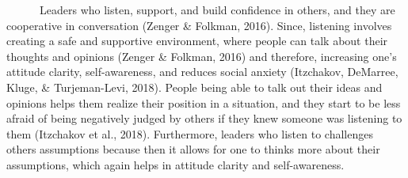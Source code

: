 \documentclass[
  12pt,
]{article}
\begin{document}
~~~~~~Leaders who listen, support, and build confidence in others, and they are cooperative in conversation (Zenger \& Folkman, 2016). Since, listening involves creating a safe and supportive environment, where people can talk about their thoughts and opinions (Zenger \& Folkman, 2016) and therefore, increasing one's attitude clarity, self-awareness, and reduces social anxiety (Itzchakov, DeMarree, Kluge, \& Turjeman-Levi, 2018). People being able to talk out their ideas and opinions helps them realize their position in a situation, and they start to be less afraid of being negatively judged by others if they knew someone was listening to them (Itzchakov et al., 2018). Furthermore, leaders who listen to challenges others assumptions because then it allows for one to thinks more about their assumptions, which again helps in attitude clarity and self-awareness.
\end{document}
